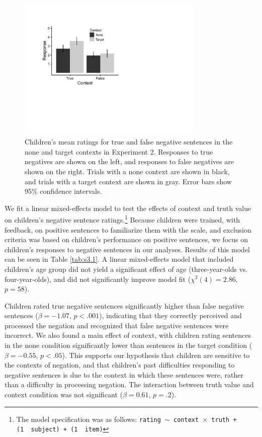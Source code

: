 \documentclass[man, noapacite]{apa2}
\begin{document}
\begin{figure}
\begin{center}
\includegraphics[width=3.5in]{figures/childmeans.pdf}
\caption{\label{fig:childmeans} Children's mean ratings for true and false negative sentences in the none and target contexts in Experiment 2. Responses to true negatives are shown on the left, and responses to false negatives are shown on the right. Trials with a none context are shown in black, and trials with a target context are shown in gray. Error bars show 95\% confidence intervals.}
\end{center}
\end{figure}

We fit a linear mixed-effects model to test the effects of context and truth value on children's negative sentence ratings.\footnote{ The model specification was as follows: \texttt{rating $\sim$ context~$\times$~truth + (1~\textbar~subject) + (1~\textbar~item)}}  Because children were trained, with feedback, on positive sentences to familiarize them with the scale, and exclusion criteria was based on children's performance on positive sentences, we focus on children's responses to negative sentences in our analyses. Results of this model can be seen in Table \ref{tab:s3.1}. A linear mixed-effects model that included children's age group did not yield a significant effect of age (three-year-olds vs. four-year-olds), and did not significantly improve model fit ($\chi ^{2}(4) = 2.86$, $p=58$).

Children rated true negative sentences significantly higher than false negative sentences ($\beta= -1.07$, $p< .001$), indicating that they correctly perceived and processed the negation and recognized that false negative sentences were incorrect. We also found a main effect of context, with children rating sentences in the none condition significantly lower than sentences in the target condition ($\beta= -0.55$, $p< .05$). This supports our hypothesis that children are sensitive to the contexts of negation, and that children's past difficulties responding to negative sentences is due to the context in which these sentences were, rather than a difficulty in processing negation. The interaction between truth value and context condition was not significant ($\beta= 0.61$, $p=.2$).
\end{document}
